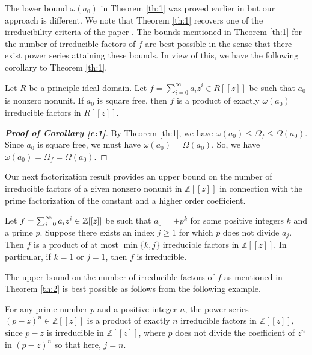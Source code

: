 \documentclass[12pt,reqno]{amsart}%
\begin{document}
The lower bound $\omega(a_0)$ in Theorem \ref{th:1} was proved earlier in \cite[Corollary 2.5]{Elliot} but our approach is different. We note that Theorem \ref{th:1} recovers one of the irreducibility criteria of the paper \cite{Daniel2008}. The bounds mentioned in Theorem \ref{th:1} for the number of irreducible factors of $f$ are best possible in the sense that there exist power series attaining these bounds. In view of this, we have the following corollary to Theorem \ref{th:1}.
\begin{corollary}\label{c:1}
Let $R$ be a principle ideal domain. Let $f=\sum_{i=0}^\infty a_i z^i \in R[[z]]$ be such that $a_0$ is nonzero nonunit. If $a_0$ is square free, then $f$ is a product of exactly $\omega(a_0)$ irreducible factors in $R[[z]]$.
\end{corollary}
\begin{proof}[\bf Proof of Corollary \ref{c:1}]
    By Theorem \ref{th:1}, we have $\omega(a_0)\leq \Omega_f\leq \Omega(a_0)$. Since $a_0$ is square free, we must have $\omega(a_0)=\Omega(a_0)$. So, we have $\omega(a_0)=\Omega_f=\Omega(a_0)$.
 \end{proof}
Our next  factorization result provides an upper bound on the number of irreducible factors of a given nonzero nonunit in $\mathbb{Z}[[z]]$ in connection with the prime factorization of the constant and a higher order coefficient.
\begin{theorem}\label{th:2}
    Let $f = \sum_{i=0}^\infty a_i z^i\in \Bbb{Z}[[z]]$ be such that $a_0=\pm p^k$ for some  positive integers $k$ and a prime $p$. Suppose there exists an index $j\geq 1$ for which $p$ does not divide $a_j$. Then $f$ is a product of at most $\min\{k,j\}$ irreducible factors in $\mathbb{Z}[[z]]$. In particular, if $k=1$ or $j=1$, then $f$ is irreducible.
\end{theorem}
The upper bound on the number of irreducible factors of $f$ as mentioned in Theorem \ref{th:2} is best possible as follows from the following example.

For any prime number $p$ and a positive integer $n$, the power series $(p-z)^n\in \mathbb{Z}[[z]]$ is a product of exactly $n$ irreducible factors in $\mathbb{Z}[[z]]$, since $p-z$ is irreducible in $\mathbb{Z}[[z]]$, where $p$ does not divide the coefficient of $z^n$ in $(p-z)^n$ so that here, $j=n$.
\end{document}
